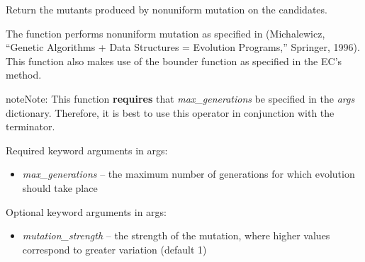 \documentclass[letterpaper,10pt,english]{sphinxmanual}
\begin{document}

\begin{fulllineitems}
\label{reference:inspyred.ec.variators.nonuniform_mutation}
Return the mutants produced by nonuniform mutation on the candidates.

The function performs nonuniform mutation as specified in
(Michalewicz, ``Genetic Algorithms + Data Structures = Evolution
Programs,'' Springer, 1996). This function also makes use of the 
bounder function as specified in the EC's  method.

\begin{notice}{note}{Note:}
This function \textbf{requires} that \emph{max\_generations} be specified in 
the \emph{args} dictionary. Therefore, it is best to use this operator 
in conjunction with the  terminator.
\end{notice}

Required keyword arguments in args:
\begin{itemize}
\item {} 
\emph{max\_generations} -- the maximum number of generations for which
evolution should take place

\end{itemize}

Optional keyword arguments in args:
\begin{itemize}
\item {} 
\emph{mutation\_strength} -- the strength of the mutation, where higher
values correspond to greater variation (default 1)

\end{itemize}

\end{fulllineitems}

\end{document}
